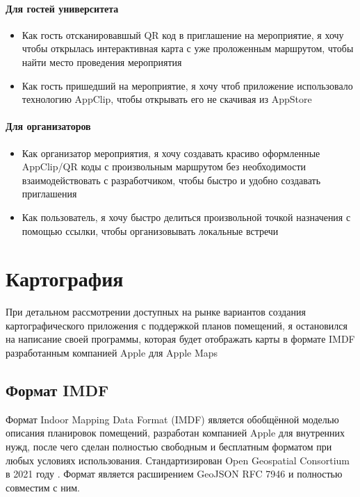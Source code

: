     \subsubsection{Для гостей университета}
      \begin{itemize}
        \item Как гость отсканировавшый QR код в приглашение на мероприятие, я хочу чтобы открылась интерактивная карта с уже проложенным маршрутом, чтобы найти место проведения мероприятия
        \item Как гость пришедший на мероприятие, я хочу чтоб приложение использовало технологию AppClip, чтобы открывать его не скачивая из AppStore
      \end{itemize}
    \subsubsection{Для организаторов}
      \begin{itemize}
        \item Как организатор мероприятия, я хочу создавать красиво оформленные AppClip/QR коды с произвольным маршрутом без необходимости взаимодействовать с разработчиком, чтобы быстро и удобно создавать приглашения
        \item Как пользователь, я хочу быстро делиться произвольной точкой назначения с помощью ссылки, чтобы организовывать локальные встречи
      \end{itemize}



\chapter{Картография}
  При детальном рассмотрении доступных на рынке вариантов создания картографического приложения с поддержкой планов помещений, я остановился на написание своей программы, которая будет отображать карты в формате IMDF разработанным компанией Apple для Apple Maps
  \section{Формат IMDF}
    Формат Indoor Mapping Data Format (IMDF) \cite{IMDF} является обобщённой моделью описания планировок помещений, разработан компанией Apple для внутренних нужд, после чего сделан полностью свободным и бесплатным форматом при любых условиях использования. Стандартизирован Open Geospatial Consortium в 2021 году \cite{https://www.ogc.org/pressroom/pressreleases/4415}. Формат является расширением GeoJSON RFC 7946 \cite{GeoJSON RFC 7946} и полностью совместим с ним.

